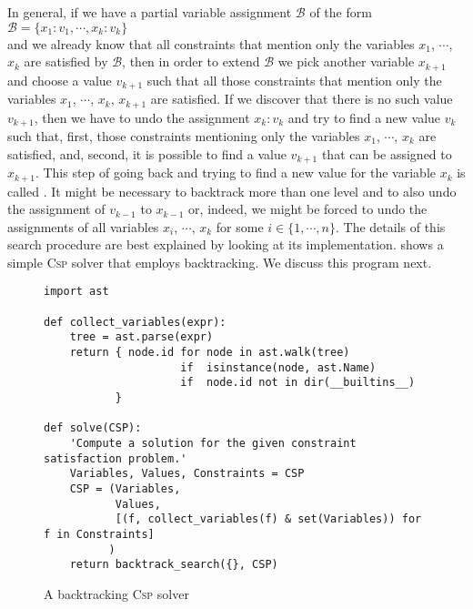 In general, if we have a partial variable assignment $\mathcal{B}$ of the form
\\[0.2cm]
\hspace*{1.3cm}
$\mathcal{B} = \{ x_1:v_1, \cdots, x_k:v_k \}$
\\[0.2cm]
and we already know that all constraints that mention only the variables $x_1$, $\cdots$, $x_k$ are satisfied
by $\mathcal{B}$, then in order to extend $\mathcal{B}$ we pick another variable $x_{k+1}$ and choose a
value $v_{k+1}$ such that all those constraints that mention only the variables  $x_1$, $\cdots$, $x_k$,
$x_{k+1}$ are satisfied.  If we discover that there is no such value $v_{k+1}$, then we have to undo the
assignment $x_k:v_k$ and try to find a new value $v_k$ such that, first, those constraints mentioning only 
the variables  $x_1$, $\cdots$, $x_k$ are satisfied, and, second, it is possible to find a value $v_{k+1}$ that
can be assigned to $x_{k+1}$.  This step of going back and trying to find a new value for the variable $x_k$ is
called .  It might be necessary to backtrack more than one level and to also undo the
assignment of $v_{k-1}$ to $x_{k-1}$ or, indeed, we might be forced to undo the assignments of all variables
$x_i$, $\cdots$, $x_k$ for some $i \in \{1,\cdots, n\}$.  The details of this search procedure are best
explained by looking at its implementation.  shows a simple \textsc{Csp} solver that
employs backtracking.  We discuss this program next.

\begin{figure}[!ht]
\centering
\begin{verbatim}
import ast
              
def collect_variables(expr): 
    tree = ast.parse(expr)
    return { node.id for node in ast.walk(tree) 
                     if  isinstance(node, ast.Name) 
                     if  node.id not in dir(__builtins__)
           }
              
def solve(CSP):
    'Compute a solution for the given constraint satisfaction problem.'
    Variables, Values, Constraints = CSP
    CSP = (Variables,
           Values,
           [(f, collect_variables(f) & set(Variables)) for f in Constraints]
          )
    return backtrack_search({}, CSP)
\end{verbatim}
\vspace*{-0.3cm}
\caption{A backtracking \textsc{Csp} solver}
\label{fig:CSP-Solver.ipynb}
\end{figure}


